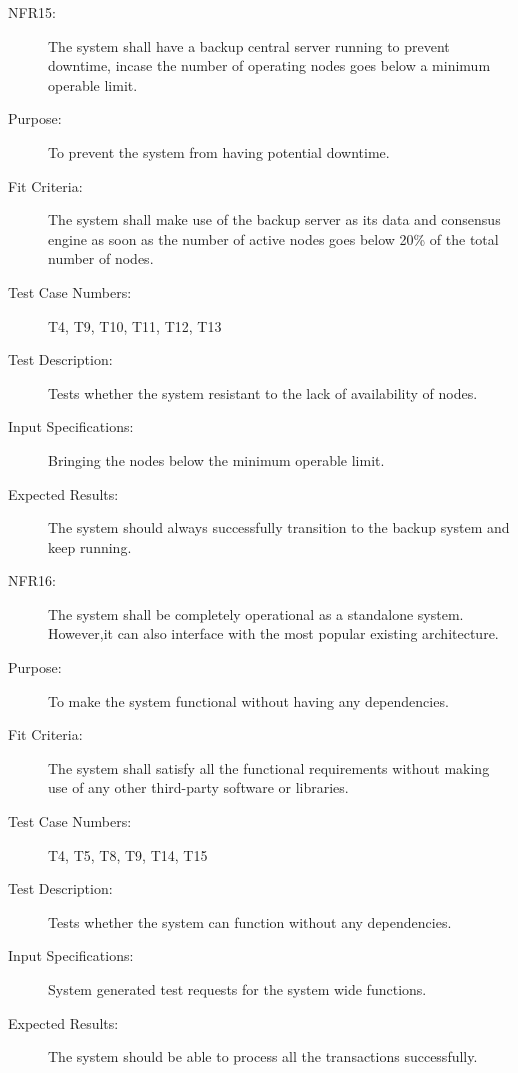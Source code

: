 \documentclass[a4paper,twoside,phd]{BYUPhys}
\begin{document}
\begin{description}
\item[NFR15:] The system shall have a backup central server running to prevent downtime, incase the number of operating nodes goes below a minimum operable limit.
\item[Purpose:] To prevent the system from having potential downtime.
\item[Fit Criteria:] The system shall make use of the backup server as its data and consensus engine as soon as the number of active nodes goes below 20\% of the total number of nodes.
\item[Test Case Numbers:] T4, T9, T10, T11, T12, T13
\item[Test Description:] Tests whether the system resistant to the lack of availability of nodes.
\item[Input Specifications:] Bringing the nodes below the minimum operable limit.
\item[Expected Results:] The system should always successfully transition to the backup system and keep running.

\item[NFR16:] The system shall be completely operational as a standalone system.  However,it can also interface with the most popular existing architecture.
\item[Purpose:] To make the system functional without having any dependencies.
\item[Fit Criteria:] The system shall satisfy all the functional requirements without making use of any other third-party software or libraries.
\item[Test Case Numbers:] T4, T5, T8, T9, T14, T15
\item[Test Description:] Tests whether the system can function without any dependencies.
\item[Input Specifications:] System generated test requests for the system wide functions.
\item[Expected Results:] The system should be able to process all the transactions successfully.
\end{description}
\end{document}

